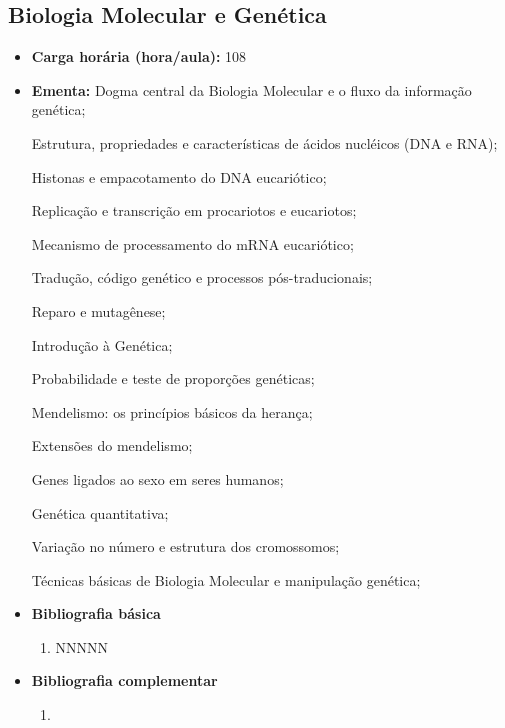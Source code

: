 \documentclass[11pt,fleqn]{book} %
\begin{document}
\subsection{Biologia Molecular e Genética}\label{disc:biomol}
\begin{itemize}
	\item \textbf{Carga horária (hora/aula):} 108
	\item \textbf{Ementa:}
	Dogma central da Biologia Molecular e o fluxo da informação genética;
	
	Estrutura, propriedades e características de ácidos nucléicos (DNA e RNA);

	Histonas e empacotamento do DNA eucariótico; 	
	
	Replicação e transcrição em procariotos e eucariotos;
	
	Mecanismo de processamento do mRNA eucariótico; 
	
	Tradução, código genético e processos pós-traducionais; 
	
	
	Reparo e mutagênese;
	
	Introdução à Genética;

	Probabilidade e teste de proporções genéticas; 

	Mendelismo: os princípios básicos da herança; 

	Extensões do mendelismo; 

	Genes ligados ao sexo em seres humanos;

	Genética quantitativa;

	Variação no número e estrutura dos cromossomos;

	Técnicas básicas de Biologia Molecular e manipulação genética;
	
	\item \textbf{Bibliografia básica}
	\begin{enumerate}
		\item NNNNN
	\end{enumerate}
	\item \textbf{Bibliografia complementar}
	\begin{enumerate}
		\item 
	\end{enumerate}	
\end{itemize}


\newpage
\end{document}
